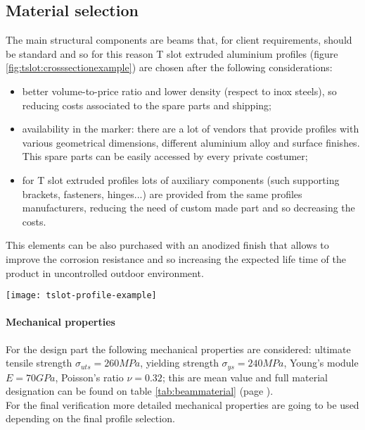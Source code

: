 \subsection{Material selection}
	
	The main structural components are beams that, for client requirements, should be standard and so for this reason T slot extruded aluminium profiles (figure \ref{fig:tslot:crosssectionexample}) are chosen after the following considerations:
	\begin{itemize}
		\item better volume-to-price ratio and lower density (respect to inox steels), so reducing costs associated to the spare parts and shipping;
		\item availability in the marker: there are a lot of vendors that provide profiles with various geometrical dimensions, different aluminium alloy and surface finishes. This spare parts can be easily accessed by every private costumer;
		\item for T slot extruded profiles lots of auxiliary components (such supporting brackets, fasteners, hinges...)  are provided from the same profiles manufacturers, reducing the need of custom made part and so decreasing the costs.
	\end{itemize}

	This elements can be also purchased with an anodized finish that allows to improve the corrosion resistance and so increasing the expected life time of the product in uncontrolled outdoor environment.
	
	\begin{SCfigure}[1.5][bh]
		\centering\texttt{[image: tslot-profile-example]}
		\caption{technical drawing of a T-slot profile's cross-section. The particular sketch represent the model \texttt{TS40-40LM} by Tslots \cite{tslot-ds}.}
		\label{fig:tslot:crosssectionexample}
	\end{SCfigure}
	
	\paragraph{Mechanical properties} For the design part the following mechanical properties are considered: ultimate tensile strength $\sigma_{uts} = 260 MPa$, yielding strength $\sigma_{ys} = 240 MPa$, Young's module $E = 70 GPa$, Poisson's ratio $\nu = 0.32$; this are mean value and full material designation can be found on table \ref{tab:beammaterial} (page \pageref{tab:beammaterial}).\\
	For the final verification more detailed mechanical properties are going to be used depending on the final profile selection.
	
	
	
	
	
		
	
	
	
	
	
	
	
	
	
	
	
	
	